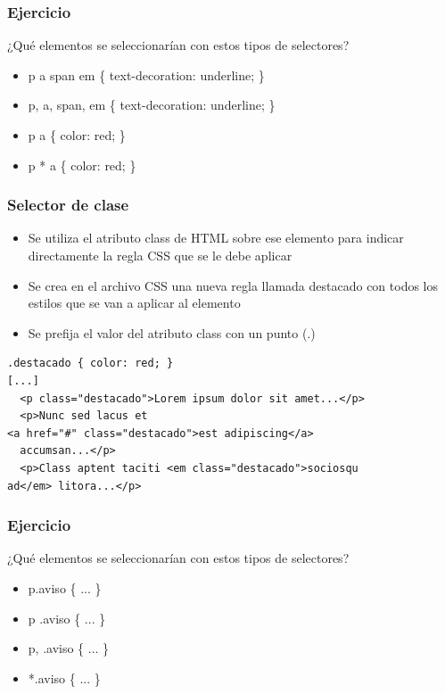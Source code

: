 
\begin{frame}
\frametitle{Ejercicio}

¿Qué elementos se seleccionarían con estos tipos de selectores?

\begin{itemize}
  \item p a span em \{ text-decoration: underline; \}
  \item p, a, span, em \{ text-decoration: underline; \}
  \item p a \{ color: red; \}
  \item p * a \{ color: red; \}
\end{itemize}

\end{frame}


\begin{frame}[fragile]
\frametitle{Selector de clase}

\begin{itemize}
  \item Se utiliza el atributo class de HTML sobre ese elemento para indicar directamente la regla CSS que se le debe aplicar
  \item Se crea en el archivo CSS una nueva regla llamada destacado con todos los estilos que se van a aplicar al elemento
  \item Se prefija el valor del atributo class con un punto (.)
\end{itemize}

{\footnotesize
\begin{verbatim}
.destacado { color: red; }
[...]
  <p class="destacado">Lorem ipsum dolor sit amet...</p>
  <p>Nunc sed lacus et 
<a href="#" class="destacado">est adipiscing</a>
  accumsan...</p>
  <p>Class aptent taciti <em class="destacado">sociosqu
ad</em> litora...</p>
\end{verbatim}
}

\end{frame}



\begin{frame}
\frametitle{Ejercicio}

¿Qué elementos se seleccionarían con estos tipos de selectores?

\begin{itemize}
  \item p.aviso \{ ... \}
  \item p .aviso \{ ... \}
  \item p, .aviso \{ ... \}
  \item *.aviso \{ ... \}
\end{itemize}

\end{frame}


